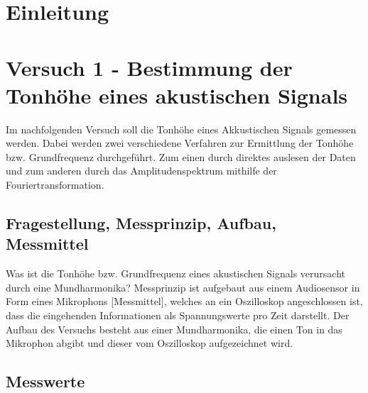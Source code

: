 \documentclass[12pt,oneside,a4paper]{report}
\begin{document}




\clearpage

%
%


%
%


%
%


%
%




\setcounter{page}{1}
%
%
\chapter{Einleitung}
\label{chap:EINL}

\cite{Franz2015j}

%
%
\chapter{Versuch 1 - Bestimmung der Tonhöhe eines akustischen Signals}
\label{chap:VERSUCH_1}
Im nachfolgenden Versuch soll die Tonhöhe eines Akkustischen Signals gemessen werden. Dabei werden zwei verschiedene Verfahren zur Ermittlung der Tonhöhe bzw. Grundfrequenz durchgeführt. Zum einen durch direktes auslesen der Daten und zum anderen durch das Amplitudenspektrum mithilfe der Fouriertransformation.

\section{Fragestellung, Messprinzip, Aufbau, Messmittel}
\label{chap:VERSUCH_1_FRAGESTELLUNG}
Was ist die Tonhöhe bzw. Grundfrequenz eines akustischen Signals verursacht durch eine Mundharmonika?
Messprinzip ist aufgebaut aus einem Audiosensor in Form eines Mikrophons [Messmittel], welches an ein Oszilloskop angeschlossen ist, dass die eingehenden Informationen als Spannungswerte pro Zeit darstellt.
Der Aufbau des Versuchs besteht aus einer Mundharmonika, die einen Ton in das Mikrophon abgibt und dieser vom Oszilloskop aufgezeichnet wird.

\section{Messwerte}
\label{chap:VERSUCH_1_MESSWERTE}
\end{document}
